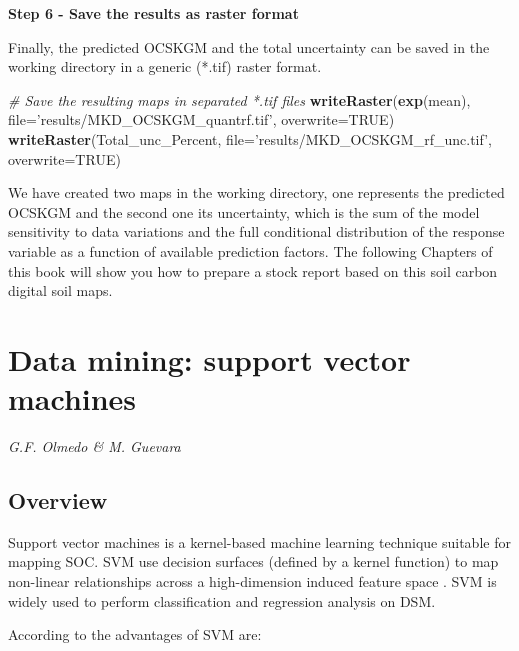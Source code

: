 \documentclass[10pt,b5paper,]{book}
\newenvironment{Shaded}{\begin{snugshade}}{\end{snugshade}}
\newcommand{\CommentTok}[1]{\textcolor[rgb]{0.56,0.35,0.01}{\textit{#1}}}
\newcommand{\DataTypeTok}[1]{\textcolor[rgb]{0.13,0.29,0.53}{#1}}
\newcommand{\KeywordTok}[1]{\textcolor[rgb]{0.13,0.29,0.53}{\textbf{#1}}}
\newcommand{\NormalTok}[1]{#1}
\newcommand{\OtherTok}[1]{\textcolor[rgb]{0.56,0.35,0.01}{#1}}
\newcommand{\StringTok}[1]{\textcolor[rgb]{0.31,0.60,0.02}{#1}}
\theoremstyle{definition}
\theoremstyle{definition}
\theoremstyle{definition}
\theoremstyle{remark}
\begin{document}
\textbf{Step 6 - Save the results as raster format}

Finally, the predicted OCSKGM and the total uncertainty can be saved in
the working directory in a generic (*.tif) raster format.

\begin{Shaded}
\begin{Highlighting}[]
\CommentTok{# Save the resulting maps in separated *.tif files}
\KeywordTok{writeRaster}\NormalTok{(}\KeywordTok{exp}\NormalTok{(mean), }\DataTypeTok{file=}\StringTok{'results/MKD_OCSKGM_quantrf.tif'}\NormalTok{, }
            \DataTypeTok{overwrite=}\OtherTok{TRUE}\NormalTok{)}
\KeywordTok{writeRaster}\NormalTok{(Total_unc_Percent, }\DataTypeTok{file=}\StringTok{'results/MKD_OCSKGM_rf_unc.tif'}\NormalTok{,}
            \DataTypeTok{overwrite=}\OtherTok{TRUE}\NormalTok{)}
\end{Highlighting}
\end{Shaded}

We have created two maps in the working directory, one represents the
predicted OCSKGM and the second one its uncertainty, which is the sum of
the model sensitivity to data variations and the full conditional
distribution of the response variable as a function of available
prediction factors. The following Chapters of this book will show you
how to prepare a stock report based on this soil carbon digital soil
maps.

\clearpage

\hypertarget{svm}{%
\section{Data mining: support vector machines}\label{svm}}

\emph{G.F. Olmedo \& M. Guevara}

\hypertarget{overview-3}{%
\subsection{Overview}\label{overview-3}}

Support vector machines is a kernel-based machine learning technique
suitable for mapping SOC. SVM use decision surfaces (defined by a kernel
function) to map non-linear relationships across a high-dimension
induced feature space \citep{cortes1995support}. SVM is widely used to
perform classification and regression analysis on DSM.

According to \citet{scikit} the advantages of SVM are:
\end{document}

